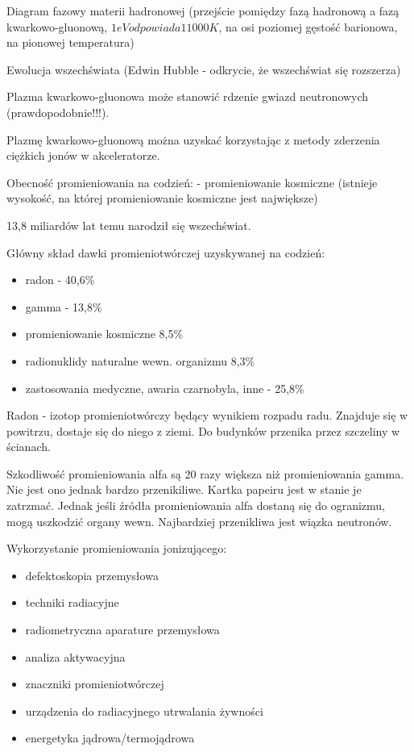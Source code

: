 \documentclass{article}
\begin{document}
Diagram fazowy materii hadronowej (przejście pomiędzy fazą hadronową a fazą kwarkowo-gluonową, $1 eV odpowiada 11000K$, na osi poziomej gęstość barionowa, na pionowej temperatura)

Ewolucja wszechświata
(Edwin Hubble - odkrycie, że wszechświat się rozszerza)

Plazma kwarkowo-gluonowa może stanowić rdzenie gwiazd neutronowych (prawdopodobnie!!!).

Plazmę kwarkowo-gluonową można uzyskać korzystając z metody zderzenia ciężkich jonów w akceleratorze.

Obecność promieniowania na codzień:
- promieniowanie kosmiczne (istnieje wysokość, na której promieniowanie kosmiczne jest największe)

13,8 miliardów lat temu narodził się wszechświat.

Główny skład dawki promieniotwórczej uzyskywanej na codzień:
\begin{itemize}
    \item radon - 40,6\%
    \item gamma - 13,8\%
    \item promieniowanie kosmiczne 8,5\%
    \item radionuklidy naturalne wewn. organizmu 8,3\%
    \item zastosowania medyczne, awaria czarnobyla, inne - 25,8\%
\end{itemize}

Radon - izotop promieniotwórczy będący wynikiem rozpadu radu. Znajduje się w powitrzu, dostaje się do niego z ziemi. Do budynków przenika przez szczeliny w ścianach.

Szkodliwość promieniowania alfa są 20 razy większa niż promieniowania gamma. Nie jest ono jednak bardzo przenikiliwe. Kartka papeiru jest w stanie je zatrzmać. Jednak jeśli źródła promieniowania alfa dostaną się do ogranizmu, mogą uszkodzić organy wewn.
Najbardziej przenikliwa jest wiązka neutronów.

Wykorzystanie promieniowania jonizującego:
\begin{itemize}
    \item defektoskopia przemysłowa
    \item techniki radiacyjne
    \item radiometryczna aparature przemysłowa
    \item analiza aktywacyjna
    \item znaczniki promieniotwórczej
    \item urządzenia do radiacyjnego utrwalania żywności
    \item energetyka jądrowa\slash termojądrowa
\end{itemize}
\end{document}
